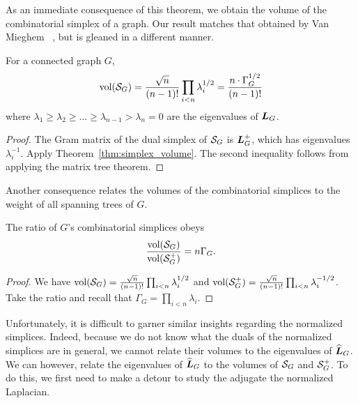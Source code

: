 As an immediate consequence of this theorem, we obtain the volume of the combinatorial simplex of a graph. Our  result matches  that obtained by Van Mieghem \etal~\cite{van2017pseudoinverse}, but is gleaned  in a  different manner. 

\begin{corollary}
	\label{cor:vol(SG)}
	For a connected graph $G$, 
	\begin{equation*}
	\textnormal{vol}(\mathcal{S}_G) = \frac{\sqrt{n}}{(n-1)!}\prod_{i<n}\lambda_i^{1/2}  = \frac{n \cdot\Gamma_G^{1/2}}{(n-1)!}
	\end{equation*}
	where  $\lambda_1\geq \lambda_2\geq \dots\geq\lambda_{n-1}>  \lambda_n=0$  are the eigenvalues of $\vb*{L}_G$. 
\end{corollary}
\begin{proof}
	The Gram matrix of the dual simplex of $\mathcal{S}_G$ is $\vb*{L}_G^+$,  which has eigenvalues $\lambda_i^{-1}$. Apply  Theorem~\ref{thm:simplex_volume}. The second  inequality follows from applying the matrix tree theorem.  
\end{proof}

Another consequence relates the volumes of the combinatorial simplices to the weight  of all spanning trees of $G$.  

\begin{corollary}
	\label{cor:vol(SG)/vol(S+)}
	The ratio of $G$'s combinatorial simplices  obeys
	\begin{align*}
	\frac{\textnormal{vol}(\mathcal{S}_G)}{\textnormal{vol}(\mathcal{S}_G^+)} = n\Gamma_G. 
	\end{align*}
\end{corollary} 
\begin{proof}
	We have $\textnormal{vol}(\mathcal{S}_G) = \frac{\sqrt{n}}{(n-1)!}\prod_{i<n}{\lambda_i^{1/2}}$ and  $\textnormal{vol}(\mathcal{S}_G^+) = \frac{\sqrt{n}}{(n-1)!}\prod_{i<n}{\lambda_i^{-1/2}}$. Take the  ratio   and recall that $\Gamma_G = \prod_{i<n}\lambda_i$.  
\end{proof}

Unfortunately,   it is  difficult to  garner  similar insights regarding the  normalized simplices. Indeed, because we do  not know what the duals of the normalized simplices are in general,  we cannot relate their volumes to the eigenvalues of $\widehat{\vb*{L}}_G$. We can however, relate  the eigenvalues of $\widehat{\vb*{L}}_G$ to the volumes of $\mathcal{S}_G$ and  $\mathcal{S}_G^+$.  To  do  this, we first need  to make a detour to  study the adjugate the normalized Laplacian. 

